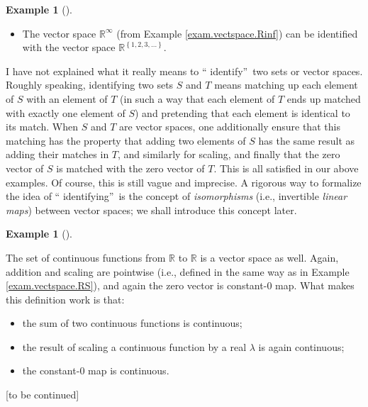\documentclass[numbers=enddot,12pt,final,onecolumn,notitlepage]{scrartcl}%
\theoremstyle{definition}
\newtheorem{exam}[theo]{Example}
\newenvironment{example}[1][]
{\begin{exam}[#1]\begin{leftbar}}
{\end{leftbar}\end{exam}}
\begin{document}
\begin{example}
\begin{itemize}
\item The vector space $\mathbb{R}^{\infty}$ (from Example
\ref{exam.vectspace.Rinf}) can be identified with the vector space
$\mathbb{R}^{\left\{  1,2,3,\ldots\right\}  }$.
\end{itemize}

I have not explained what it really means to \textquotedblleft
identify\textquotedblright\ two sets or vector spaces. Roughly speaking,
identifying two sets $S$ and $T$ means matching up each element of $S$ with an
element of $T$ (in such a way that each element of $T$ ends up matched with
exactly one element of $S$) and pretending that each element is identical to
its match. When $S$ and $T$ are vector spaces, one additionally ensure that
this matching has the property that adding two elements of $S$ has the same
result as adding their matches in $T$, and similarly for scaling, and finally
that the zero vector of $S$ is matched with the zero vector of $T$. This is
all satisfied in our above examples. Of course, this is still vague and
imprecise. A rigorous way to formalize the idea of \textquotedblleft
identifying\textquotedblright\ is the concept of \textit{isomorphisms} (i.e.,
invertible \textit{linear maps}) between vector spaces; we shall introduce
this concept later.
\end{example}

\begin{example}
The set of continuous functions from $\mathbb{R}$ to $\mathbb{R}$ is a vector
space as well. Again, addition and scaling are pointwise (i.e., defined in the
same way as in Example \ref{exam.vectspace.RS}), and again the zero vector is
constant-$0$ map. What makes this definition work is that:

\begin{itemize}
\item the sum of two continuous functions is continuous;

\item the result of scaling a continuous function by a real $\lambda$ is again continuous;

\item the constant-$0$ map is continuous.
\end{itemize}
\end{example}

[to be continued]
\end{document}
